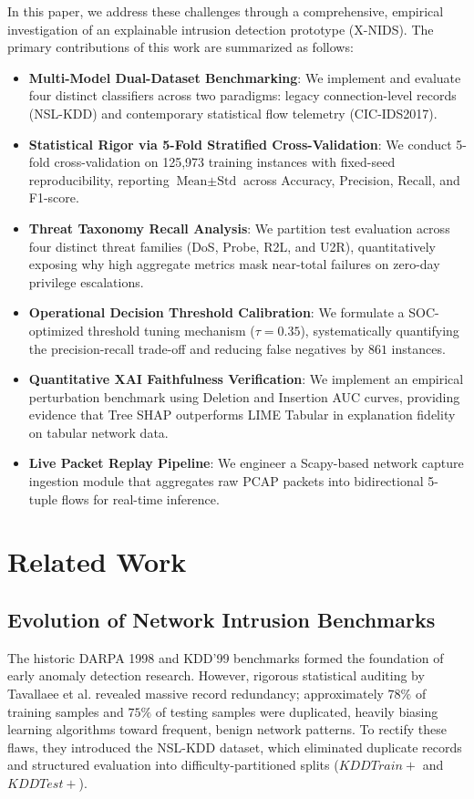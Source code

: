 \documentclass[conference]{IEEEtran}
\begin{document}
In this paper, we address these challenges through a comprehensive, empirical investigation of an explainable intrusion detection prototype (X-NIDS). The primary contributions of this work are summarized as follows:

\begin{itemize}
    \item \textbf{Multi-Model Dual-Dataset Benchmarking}: We implement and evaluate four distinct classifiers across two paradigms: legacy connection-level records (NSL-KDD) and contemporary statistical flow telemetry (CIC-IDS2017).
    \item \textbf{Statistical Rigor via 5-Fold Stratified Cross-Validation}: We conduct 5-fold cross-validation on 125,973 training instances with fixed-seed reproducibility, reporting $\text{Mean} \pm \text{Std}$ across Accuracy, Precision, Recall, and F1-score.
    \item \textbf{Threat Taxonomy Recall Analysis}: We partition test evaluation across four distinct threat families (DoS, Probe, R2L, and U2R), quantitatively exposing why high aggregate metrics mask near-total failures on zero-day privilege escalations.
    \item \textbf{Operational Decision Threshold Calibration}: We formulate a SOC-optimized threshold tuning mechanism ($\tau = 0.35$), systematically quantifying the precision-recall trade-off and reducing false negatives by $861$ instances.
    \item \textbf{Quantitative XAI Faithfulness Verification}: We implement an empirical perturbation benchmark using Deletion and Insertion AUC curves, providing evidence that Tree SHAP outperforms LIME Tabular in explanation fidelity on tabular network data.
    \item \textbf{Live Packet Replay Pipeline}: We engineer a Scapy-based network capture ingestion module that aggregates raw PCAP packets into bidirectional 5-tuple flows for real-time inference.
\end{itemize}

\section{Related Work}

\subsection{Evolution of Network Intrusion Benchmarks}

The historic DARPA 1998 and KDD'99 benchmarks formed the foundation of early anomaly detection research. However, rigorous statistical auditing by Tavallaee et al. \cite{tavallaee2009detailed} revealed massive record redundancy; approximately $78\%$ of training samples and $75\%$ of testing samples were duplicated, heavily biasing learning algorithms toward frequent, benign network patterns. To rectify these flaws, they introduced the NSL-KDD dataset, which eliminated duplicate records and structured evaluation into difficulty-partitioned splits ($KDDTrain+$ and $KDDTest+$).
\end{document}
